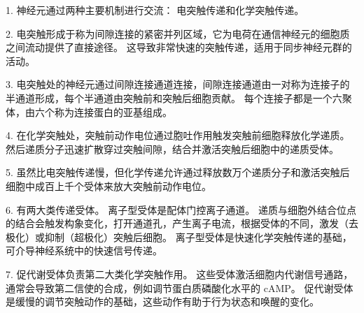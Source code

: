 1. 神经元通过两种主要机制进行交流：
电突触传递和化学突触传递。


2. 电突触形成于称为间隙连接的紧密并列区域，它为电荷在通信神经元的细胞质之间流动提供了直接途径。
这导致非常快速的突触传递，适用于同步神经元群的活动。 


3. 电突触处的神经元通过间隙连接通道连接，间隙连接通道由一对称为连接子的半通道形成，每个半通道由突触前和突触后细胞贡献。
每个连接子都是一个六聚体，由六个称为连接蛋白的亚基组成。 


4. 在化学突触处，突触前动作电位通过胞吐作用触发突触前细胞释放化学递质。
然后递质分子迅速扩散穿过突触间隙，结合并激活突触后细胞中的递质受体。


5. 虽然比电突触传递慢，但化学传递允许通过释放数万个递质分子和激活突触后细胞中成百上千个受体来放大突触前动作电位。


6. 有两大类传递受体。
离子型受体是配体门控离子通道。
递质与细胞外结合位点的结合会触发构象变化，打开通道孔，产生离子电流，根据受体的不同，激发（去极化）或抑制（超极化）突触后细胞。
离子型受体是快速化学突触传递的基础，可介导神经系统中的快速信号传递。


7. 促代谢受体负责第二大类化学突触作用。
这些受体激活细胞内代谢信号通路，通常会导致第二信使的合成，例如调节蛋白质磷酸化水平的 cAMP。
促代谢受体是缓慢的调节突触动作的基础，这些动作有助于行为状态和唤醒的变化。



